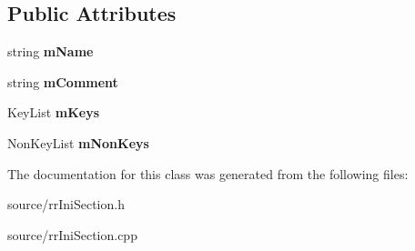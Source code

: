 \subsection*{Public Attributes}
\begin{DoxyCompactItemize}
\item 
\hypertarget{classrr_1_1_ini_section_a0e119942f124e1e41d767981ae5da973}{string {\bfseries m\-Name}}\label{classrr_1_1_ini_section_a0e119942f124e1e41d767981ae5da973}

\item 
\hypertarget{classrr_1_1_ini_section_addef9556beaef11c5b7ef589b2c9c0fb}{string {\bfseries m\-Comment}}\label{classrr_1_1_ini_section_addef9556beaef11c5b7ef589b2c9c0fb}

\item 
\hypertarget{classrr_1_1_ini_section_acf07b88798fac7d8f417b949bcee3270}{Key\-List {\bfseries m\-Keys}}\label{classrr_1_1_ini_section_acf07b88798fac7d8f417b949bcee3270}

\item 
\hypertarget{classrr_1_1_ini_section_aa319e2e48ac1704b9653bd9a013fbb46}{Non\-Key\-List {\bfseries m\-Non\-Keys}}\label{classrr_1_1_ini_section_aa319e2e48ac1704b9653bd9a013fbb46}

\end{DoxyCompactItemize}


The documentation for this class was generated from the following files\-:\begin{DoxyCompactItemize}
\item 
source/rr\-Ini\-Section.\-h\item 
source/rr\-Ini\-Section.\-cpp\end{DoxyCompactItemize}
